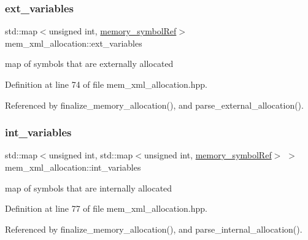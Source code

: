 \subsubsection{\texorpdfstring{ext\+\_\+variables}{ext\_variables}}
{\footnotesize\ttfamily std\+::map$<$unsigned int, \hyperlink{memory__symbol_8hpp_af3608dbc27177447c2d777fa712cc82a}{memory\+\_\+symbol\+Ref}$>$ mem\+\_\+xml\+\_\+allocation\+::ext\+\_\+variables\hspace{0.3cm}{\ttfamily [private]}}



map of symbols that are externally allocated 



Definition at line 74 of file mem\+\_\+xml\+\_\+allocation.\+hpp.



Referenced by finalize\+\_\+memory\+\_\+allocation(), and parse\+\_\+external\+\_\+allocation().

\mbox{\label{classmem__xml__allocation_a4acb07a082d8ad97b91247f8963f210e}} 
\subsubsection{\texorpdfstring{int\+\_\+variables}{int\_variables}}
{\footnotesize\ttfamily std\+::map$<$unsigned int, std\+::map$<$unsigned int, \hyperlink{memory__symbol_8hpp_af3608dbc27177447c2d777fa712cc82a}{memory\+\_\+symbol\+Ref}$>$ $>$ mem\+\_\+xml\+\_\+allocation\+::int\+\_\+variables\hspace{0.3cm}{\ttfamily [private]}}



map of symbols that are internally allocated 



Definition at line 77 of file mem\+\_\+xml\+\_\+allocation.\+hpp.



Referenced by finalize\+\_\+memory\+\_\+allocation(), and parse\+\_\+internal\+\_\+allocation().

\mbox{\label{classmem__xml__allocation_ad5160a42b79b58420e6686ce43f567f2}} 

